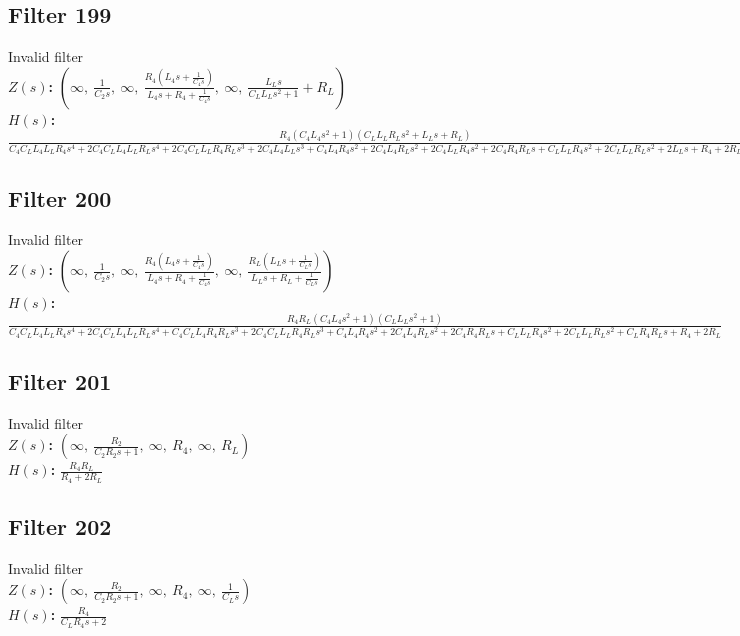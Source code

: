 \documentclass{article}
\begin{document}
\subsection*{Filter 199}
Invalid filter \\ 
\textbf{$Z(s)$:} $\left( \infty, \  \frac{1}{C_{2} s}, \  \infty, \  \frac{R_{4} \left(L_{4} s + \frac{1}{C_{4} s}\right)}{L_{4} s + R_{4} + \frac{1}{C_{4} s}}, \  \infty, \  \frac{L_{L} s}{C_{L} L_{L} s^{2} + 1} + R_{L}\right)$ \\ 
\textbf{$H(s)$:} $\frac{R_{4} \left(C_{4} L_{4} s^{2} + 1\right) \left(C_{L} L_{L} R_{L} s^{2} + L_{L} s + R_{L}\right)}{C_{4} C_{L} L_{4} L_{L} R_{4} s^{4} + 2 C_{4} C_{L} L_{4} L_{L} R_{L} s^{4} + 2 C_{4} C_{L} L_{L} R_{4} R_{L} s^{3} + 2 C_{4} L_{4} L_{L} s^{3} + C_{4} L_{4} R_{4} s^{2} + 2 C_{4} L_{4} R_{L} s^{2} + 2 C_{4} L_{L} R_{4} s^{2} + 2 C_{4} R_{4} R_{L} s + C_{L} L_{L} R_{4} s^{2} + 2 C_{L} L_{L} R_{L} s^{2} + 2 L_{L} s + R_{4} + 2 R_{L}}$ \\ 
\subsection*{Filter 200}
Invalid filter \\ 
\textbf{$Z(s)$:} $\left( \infty, \  \frac{1}{C_{2} s}, \  \infty, \  \frac{R_{4} \left(L_{4} s + \frac{1}{C_{4} s}\right)}{L_{4} s + R_{4} + \frac{1}{C_{4} s}}, \  \infty, \  \frac{R_{L} \left(L_{L} s + \frac{1}{C_{L} s}\right)}{L_{L} s + R_{L} + \frac{1}{C_{L} s}}\right)$ \\ 
\textbf{$H(s)$:} $\frac{R_{4} R_{L} \left(C_{4} L_{4} s^{2} + 1\right) \left(C_{L} L_{L} s^{2} + 1\right)}{C_{4} C_{L} L_{4} L_{L} R_{4} s^{4} + 2 C_{4} C_{L} L_{4} L_{L} R_{L} s^{4} + C_{4} C_{L} L_{4} R_{4} R_{L} s^{3} + 2 C_{4} C_{L} L_{L} R_{4} R_{L} s^{3} + C_{4} L_{4} R_{4} s^{2} + 2 C_{4} L_{4} R_{L} s^{2} + 2 C_{4} R_{4} R_{L} s + C_{L} L_{L} R_{4} s^{2} + 2 C_{L} L_{L} R_{L} s^{2} + C_{L} R_{4} R_{L} s + R_{4} + 2 R_{L}}$ \\ 
\subsection*{Filter 201}
Invalid filter \\ 
\textbf{$Z(s)$:} $\left( \infty, \  \frac{R_{2}}{C_{2} R_{2} s + 1}, \  \infty, \  R_{4}, \  \infty, \  R_{L}\right)$ \\ 
\textbf{$H(s)$:} $\frac{R_{4} R_{L}}{R_{4} + 2 R_{L}}$ \\ 
\subsection*{Filter 202}
Invalid filter \\ 
\textbf{$Z(s)$:} $\left( \infty, \  \frac{R_{2}}{C_{2} R_{2} s + 1}, \  \infty, \  R_{4}, \  \infty, \  \frac{1}{C_{L} s}\right)$ \\ 
\textbf{$H(s)$:} $\frac{R_{4}}{C_{L} R_{4} s + 2}$ \\ 
\end{document}
